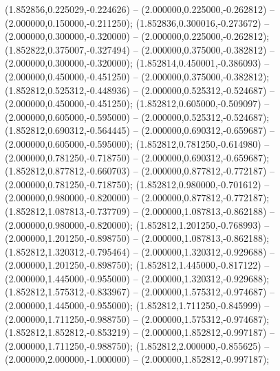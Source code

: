  (1.852856,0.225029,-0.224626) -- (2.000000,0.225000,-0.262812) -- (2.000000,0.150000,-0.211250);
 (1.852836,0.300016,-0.273672) -- (2.000000,0.300000,-0.320000) -- (2.000000,0.225000,-0.262812);
 (1.852822,0.375007,-0.327494) -- (2.000000,0.375000,-0.382812) -- (2.000000,0.300000,-0.320000);
 (1.852814,0.450001,-0.386093) -- (2.000000,0.450000,-0.451250) -- (2.000000,0.375000,-0.382812);
 (1.852812,0.525312,-0.448936) -- (2.000000,0.525312,-0.524687) -- (2.000000,0.450000,-0.451250);
 (1.852812,0.605000,-0.509097) -- (2.000000,0.605000,-0.595000) -- (2.000000,0.525312,-0.524687);
 (1.852812,0.690312,-0.564445) -- (2.000000,0.690312,-0.659687) -- (2.000000,0.605000,-0.595000);
 (1.852812,0.781250,-0.614980) -- (2.000000,0.781250,-0.718750) -- (2.000000,0.690312,-0.659687);
 (1.852812,0.877812,-0.660703) -- (2.000000,0.877812,-0.772187) -- (2.000000,0.781250,-0.718750);
 (1.852812,0.980000,-0.701612) -- (2.000000,0.980000,-0.820000) -- (2.000000,0.877812,-0.772187);
 (1.852812,1.087813,-0.737709) -- (2.000000,1.087813,-0.862188) -- (2.000000,0.980000,-0.820000);
 (1.852812,1.201250,-0.768993) -- (2.000000,1.201250,-0.898750) -- (2.000000,1.087813,-0.862188);
 (1.852812,1.320312,-0.795464) -- (2.000000,1.320312,-0.929688) -- (2.000000,1.201250,-0.898750);
 (1.852812,1.445000,-0.817122) -- (2.000000,1.445000,-0.955000) -- (2.000000,1.320312,-0.929688);
 (1.852812,1.575312,-0.833967) -- (2.000000,1.575312,-0.974687) -- (2.000000,1.445000,-0.955000);
 (1.852812,1.711250,-0.845999) -- (2.000000,1.711250,-0.988750) -- (2.000000,1.575312,-0.974687);
 (1.852812,1.852812,-0.853219) -- (2.000000,1.852812,-0.997187) -- (2.000000,1.711250,-0.988750);
 (1.852812,2.000000,-0.855625) -- (2.000000,2.000000,-1.000000) -- (2.000000,1.852812,-0.997187);
